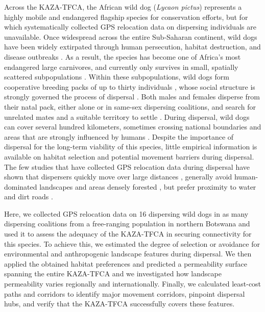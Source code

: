 \documentclass[abstract=on,10pt,a4paper,bibliography=totocnumbered]{article}
\begin{document}
Across the KAZA-TFCA, the African wild dog (\textit{Lycaon pictus}) represents a
highly mobile and endangered flagship species for conservation efforts, but for
which systematically collected GPS relocation data on dispersing individuals are
unavailable. Once widespread across the entire Sub-Saharan continent, wild dogs
have been widely extirpated through human persecution, habitat destruction, and
disease outbreaks \citep{Woodroffe.2012}. As a result, the species has become
one of Africa's most endangered large carnivores, and currently only survives in
small, spatially scattered subpopulations \citep{Woodroffe.2012}. Within these
subpopulations, wild dogs form cooperative breeding packs of up to thirty
individuals \citep{Frame.1979, Fuller.1992, Creel.2002}, whose social structure
is strongly governed the process of dispersal \citep{McNutt.1996,
Woodroffe.2019, Behr.2020}. Both males and females disperse from their natal
pack, either alone or in same-sex dispersing coalitions, and search for
unrelated mates and a suitable territory to settle \citep{McNutt.1996,
Cozzi.2020, Behr.2020}. During dispersal, wild dogs can cover several hundred
kilometers, sometimes crossing national boundaries and areas that are strongly
influenced by humans \citep{DaviesMostert.2012, Masenga.2016, Woodroffe.2019,
Cozzi.2020}. Despite the importance of dispersal for the long-term viability of
this species, little empirical information is available on habitat selection and
potential movement barriers during dispersal. The few studies that have
collected GPS relocation data during dispersal have shown that dispersers
quickly move over large distances \citep{Woodroffe.2019}, generally avoid
human-dominated landscapes \citep{Masenga.2016, Oneill.2020, Cozzi.2020} and
areas densely forested \citep{Oneill.2020}, but prefer proximity to water and
dirt roads \citep{Oneill.2020}.

Here, we collected GPS relocation data on 16 dispersing wild dogs in as many
dispersing coalitions from a free-ranging population in northern Botswana and
used it to assess the adequacy of the KAZA-TFCA in securing connectivity for
this species. To achieve this, we estimated the degree of selection or avoidance
for environmental and anthropogenic landscape features during dispersal. We then
applied the obtained habitat preferences and predicted a permeability surface
spanning the entire KAZA-TFCA and we investigated how landscape permeability
varies regionally and internationally. Finally, we calculated least-cost paths
and corridors to identify major movement corridors, pinpoint dispersal hubs, and
verify that the KAZA-TFCA successfully covers these features.
\end{document}
